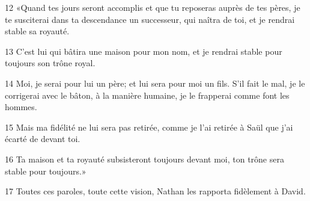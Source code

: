 
12 «Quand tes jours seront accomplis et que tu reposeras auprès de tes pères, je te susciterai dans ta descendance un successeur, qui naîtra de toi, et je rendrai stable sa royauté.

13 C’est lui qui bâtira une maison pour mon nom, et je rendrai stable pour toujours son trône royal.

14 Moi, je serai pour lui un père; et lui sera pour moi un fils. S’il fait le mal, je le corrigerai avec le bâton, à la manière humaine, je le frapperai comme font les hommes.

15 Mais ma fidélité ne lui sera pas retirée, comme je l’ai retirée à Saül que j’ai écarté de devant toi.

16 Ta maison et ta royauté subsisteront toujours devant moi, ton trône sera stable pour toujours.»

17 Toutes ces paroles, toute cette vision, Nathan les rapporta fidèlement à David.